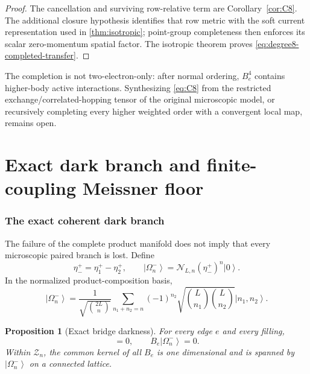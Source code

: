 \documentclass[11pt]{article}
\newtheorem{proposition}[theorem]{Proposition}
\theoremstyle{definition}
\theoremstyle{remark}
\newcommand{\cZ}{\mathcal Z}
\newcommand{\ket}[1]{\left|#1\right\rangle}
\begin{document}
\begin{proof}
The cancellation and surviving row-relative term are Corollary~\ref{cor:C8}.  The
additional closure hypothesis identifies that row metric with the soft
current representation used in \cref{thm:isotropic}; point-group completeness
then enforces its scalar zero-momentum spatial factor.  The isotropic theorem
proves \eqref{eq:degree8-completed-transfer}.
\end{proof}

The completion is not two-electron-only: after normal ordering, $B_e^4$
contains higher-body active interactions.  Synthesizing \eqref{eq:C8} from the
restricted exchange/correlated-hopping tensor of the original microscopic
model, or recursively completing every higher weighted order with a convergent
local map, remains open.


\part{Exact dark branch and finite-coupling Meissner floor}

\section{The exact coherent dark branch}\label{sec:dark}

The failure of the complete product manifold does not imply that every microscopic paired branch is lost.  Define
\begin{equation}
 \eta_-^+=\eta_1^+-\eta_2^+,
 \qquad
 \ket{\Omega_n^-}=\mathcal N_{L,n}(\eta_-^+)^n\ket0.
 \label{eq:dark-state}
\end{equation}
In the normalized product-composition basis,
\begin{equation}
 \ket{\Omega_n^-}
 =\frac1{\sqrt{\binom{2L}{n}}}
 \sum_{n_1+n_2=n}(-1)^{n_2}
 \sqrt{\binom{L}{n_1}\binom{L}{n_2}}
 \ket{n_1,n_2}.
 \label{eq:dark-coeff}
\end{equation}

\begin{proposition}[Exact bridge darkness]
\label{prop:dark}
For every edge $e$ and every filling,
\begin{equation}
 [B_e,\eta_-^+]=0,
 \qquad
 B_e\ket{\Omega_n^-}=0.
 \label{eq:darkness}
\end{equation}
Within $\cZ_n$, the common kernel of all $B_e$ is one dimensional and is spanned by $\ket{\Omega_n^-}$ on a connected lattice.
\end{proposition}
\end{document}
